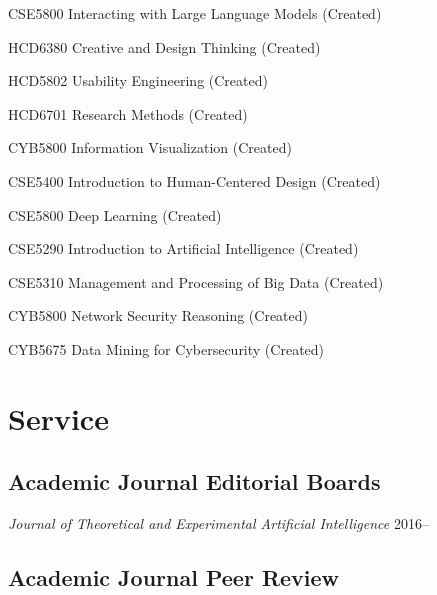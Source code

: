 \documentclass[12pt,letterpaper]{report}
\newcommand{\listitemspace}{0.25em}
\renewenvironment{itemize}
{\begin{list}{}{\setlength{\leftmargin}{0em}
                \setlength{\parskip}{0em}
                \setlength{\itemsep}{\listitemspace}
                \setlength{\parsep}{\listitemspace}}}
{\end{list}}
\begin{document}
    \begin{itemize}
        \item CSE5800 Interacting with Large Language Models (Created)
        \item HCD6380 Creative and Design Thinking (Created)
        \item HCD5802 Usability Engineering (Created)
        \item HCD6701 Research Methods (Created) 
        \item CYB5800 Information Visualization (Created)
        \item CSE5400 Introduction to Human-Centered Design (Created)
        \item CSE5800 Deep Learning (Created)
        \item CSE5290 Introduction to Artificial Intelligence (Created)
        \item CSE5310 Management and Processing of Big Data (Created)
        \item CYB5800 Network Security Reasoning (Created) 
        \item CYB5675 Data Mining for Cybersecurity (Created)
    \end{itemize}

    \section*{Service}

    \subsection*{Academic Journal Editorial Boards}

    \begin{itemize}
        \item \textit{Journal of Theoretical and Experimental Artificial Intelligence}  2016--
    \end{itemize}

    \subsection*{Academic Journal Peer Review}
\end{document}
